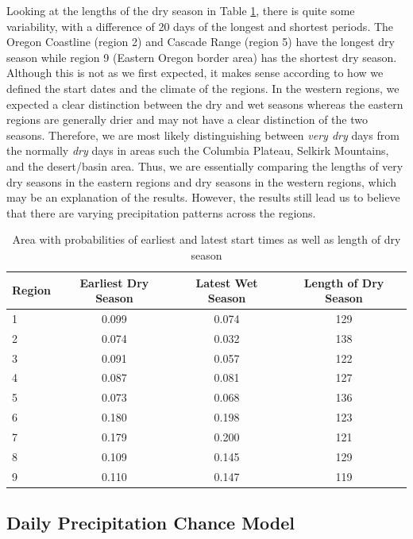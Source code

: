 \documentclass{article}
\begin{document}
Looking at the lengths of the dry season in Table \ref{lengthProb}, there is quite some variability, with a difference of 20 days of the longest and shortest periods.  The Oregon Coastline (region 2) and Cascade Range (region 5) have the longest dry season while region 9 (Eastern Oregon border area) has the shortest dry season. Although this is not as we first expected, it makes sense according to how we defined the start dates and the climate of the regions. In the western regions, we expected a clear distinction between the dry and wet seasons whereas the eastern regions are generally drier and may not have a clear distinction of the two seasons. Therefore, we are most likely distinguishing between \textit{very dry} days from the normally \textit{dry} days in areas such the Columbia Plateau, Selkirk Mountains, and the desert/basin area. Thus, we are essentially comparing the lengths of  very dry seasons in the eastern regions and dry seasons in the western regions, which may be an explanation of the results.  However, the results still lead us to believe that there are varying precipitation patterns across the regions.

\begin{table}[h!]
\begin{tabular}{|l|c|c|c|}
\hline
Region & Earliest Dry Season & Latest Wet Season & Length of Dry Season\\
\hline
\hline
1&0.099&0.074&129 \\
2&0.074&0.032&138 \\
3&0.091&0.057&122 \\
4&0.087&0.081&127\\
5&0.073&0.068&136 \\
6&0.180&0.198&123\\
7&0.179&0.200&121\\
8&0.109&0.145&129\\
9&0.110&0.147&119\\
\hline
\end{tabular}
\caption{Area with probabilities of earliest and latest start times as well as length of dry season }
\label{lengthProb}
\end{table}


\subsection{Daily Precipitation Chance Model}
\end{document}

